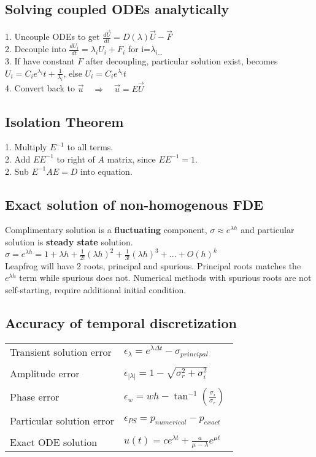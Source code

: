 \documentclass[8pt]{extarticle} %
\begin{document}
\begin{multicols*}{3}
  \subsection{Solving coupled ODEs analytically}
  1. Uncouple ODEs to get $\frac{d\vec{U}}{dt}=D(\lambda)\vec{U}-\vec{F}$\\
  2. Decouple into $\frac{dU_i}{dt}=\lambda_iU_i+F_i$ for i=$\lambda_{i...}$\\
  3. If have constant $F$ after decoupling, particular solution exist, becomes $U_i=C_ie^{\lambda_i}t+\frac{1}{\lambda_i}$, else $U_i=C_ie^{\lambda_i}t$\\
  4. Convert back to $\vec{u}\quad\Rightarrow\quad\vec{u}=E\vec{U}$
  \vspace{1ex}
  \subsection{Isolation Theorem}
  1. Multiply $E^{-1}$ to all terms.\\
  2. Add $EE^{-1}$ to right of $A$ matrix, since $EE^{-1} = 1$.\\
  2. Sub $E^{-1}AE=D$ into equation.
  \vspace{1ex}
  \subsection{Exact solution of non-homogenous FDE}
  Complimentary solution is a \textbf{fluctuating} component, $\sigma \approx e^{\lambda h}$
  and particular solution is \textbf{steady state} solution.\\
  $\sigma = e^{\lambda h}=1+\lambda h+\frac{1}{2!}(\lambda h)^2+\frac{1}{3!}(\lambda h)^3+...+O(h)^k$\\
  Leapfrog will have 2 roots, principal and spurious. Principal roots matches the $e^{\lambda h}$ term while spurious does not.
  Numerical methods with spurious roots are not self-starting, require additional initial condition.
  \vspace{1ex}
  \subsection{Accuracy of temporal discretization}
  \begin{tabular}{L{0.5\linewidth} L{1\linewidth}}
  Transient solution error & $\epsilon_\lambda=e^{\lambda \Delta t} - \sigma_{principal}$\\
  \\[-0.9em]
  Amplitude error & $\epsilon_{|\lambda |}=1-\sqrt{\sigma^2_r+\sigma^2_i}$\\
  \\[-0.9em]
  Phase error & $\epsilon_w=wh-\tan^{-1}(\frac{\sigma_i}{\sigma_r})$\\
  \\[-0.9em]
  Particular solution error & $\epsilon_{PS}=p_{numerical}-p_{exact}$\\
  \\[-0.9em]
  Exact ODE solution & $u(t) = ce^{\lambda t}+\frac{a}{\mu-\lambda}e^{\mu t}$
 \end{tabular}

\end{multicols*}
\end{document}

